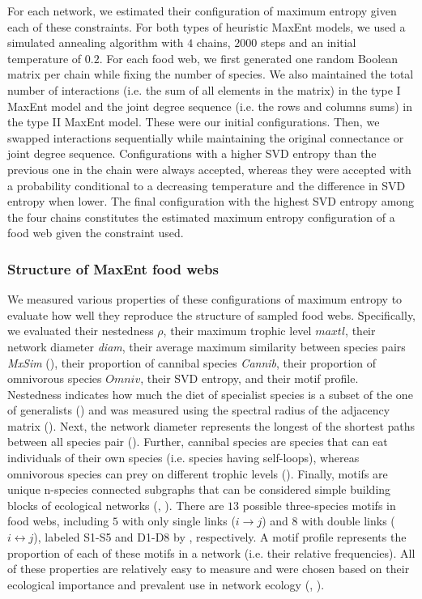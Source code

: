 For each network, we estimated their configuration of maximum entropy given each
of these constraints. For both types of heuristic MaxEnt models, we used a
simulated annealing algorithm with $4$ chains, $2000$ steps and an initial
temperature of $0.2$. For each food web, we first generated one random Boolean
matrix per chain while fixing the number of species. We also maintained the
total number of interactions (i.e. the sum of all elements in the matrix) in the
type I MaxEnt model and the joint degree sequence (i.e. the rows and columns
sums) in the type II MaxEnt model. These were our initial configurations. Then,
we swapped interactions sequentially while maintaining the original connectance
or joint degree sequence. Configurations with a higher SVD entropy than the
previous one in the chain were always accepted, whereas they were accepted with
a probability conditional to a decreasing temperature and the difference in SVD
entropy when lower. The final configuration with the highest SVD entropy among
the four chains constitutes the estimated maximum entropy configuration of a
food web given the constraint used. 

\subsubsection{Structure of MaxEnt food webs}

We measured various properties of these configurations of maximum entropy to
evaluate how well they reproduce the structure of sampled food webs.
Specifically, we evaluated their nestedness $\rho$, their maximum trophic level
$maxtl$, their network diameter \textit{diam}, their average maximum similarity
between species pairs \textit{MxSim} (\cite{Williams2000Simple}), their
proportion of cannibal species \textit{Cannib}, their proportion of omnivorous
species $Omniv$, their SVD entropy, and their motif profile. Nestedness
indicates how much the diet of specialist species is a subset of the one of
generalists (\cite{Delmas2019Analysing}) and was measured using the spectral
radius of the adjacency matrix (\cite{Staniczenko2013Ghost}). Next, the
network diameter represents the longest of the shortest paths between all
species pair (\cite{Albert2002Statistical}). Further, cannibal species are species
that can eat individuals of their own species (i.e. species having self-loops),
whereas omnivorous species can prey on different trophic levels
(\cite{Williams2000Simple}). Finally, motifs are unique n-species connected
subgraphs that can be considered simple building blocks of ecological networks
(\cite{Milo2002Network}, \cite{Stouffer2007Evidence}). There are $13$ possible
three-species motifs in food webs, including $5$ with only single links ($i
\rightarrow j$) and $8$ with double links ($i \leftrightarrow j$), labeled S1-S5
and D1-D8 by \cite{Stouffer2007Evidence}, respectively. A motif profile represents
the proportion of each of these motifs in a network (i.e. their relative
frequencies). All of these properties are relatively easy to measure and were
chosen based on their ecological importance and prevalent use in network ecology
(\cite{McCann2011Food}, \cite{Delmas2019Analysing}). 

